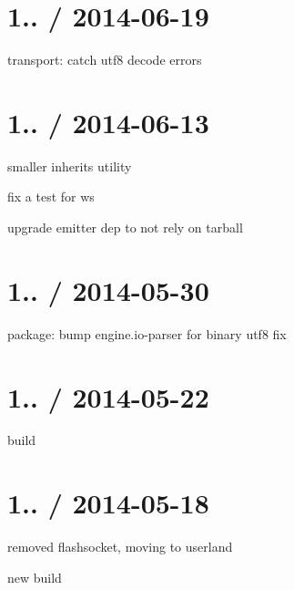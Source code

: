 \section*{1.. / 2014-\/06-\/19 }


\begin{DoxyItemize}
\item transport\+: catch utf8 decode errors
\end{DoxyItemize}

\section*{1.. / 2014-\/06-\/13 }


\begin{DoxyItemize}
\item smaller inherits utility
\item fix a test for ws
\item upgrade emitter dep to not rely on tarball
\end{DoxyItemize}

\section*{1.. / 2014-\/05-\/30 }


\begin{DoxyItemize}
\item package\+: bump {\ttfamily engine.\+io-\/parser} for binary utf8 fix
\end{DoxyItemize}

\section*{1.. / 2014-\/05-\/22 }


\begin{DoxyItemize}
\item build
\end{DoxyItemize}

\section*{1.. / 2014-\/05-\/18 }


\begin{DoxyItemize}
\item removed flashsocket, moving to userland
\item new build
\end{DoxyItemize}

